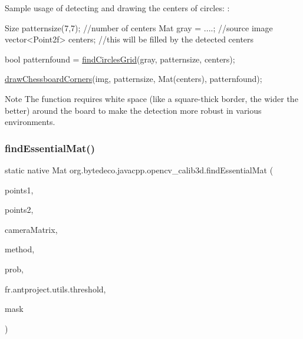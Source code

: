 Sample usage of detecting and drawing the centers of circles\+: \+: 
\begin{DoxyPre}
\begin{DoxyCode}
Size patternsize(7,7); \textcolor{comment}{//number of centers}
Mat gray = ....; \textcolor{comment}{//source image}
vector<Point2f> centers; \textcolor{comment}{//this will be filled by the detected centers}

\textcolor{keywordtype}{bool} patternfound = \hyperlink{group__calib3d_ga150470ce16ca1879fd1809729801803b}{findCirclesGrid}(gray, patternsize, centers);

\hyperlink{group__calib3d_ga71d497eb4a9eead84d1e4522d54ed580}{drawChessboardCorners}(img, patternsize, Mat(centers), patternfound);
\end{DoxyCode}
 \end{DoxyPre}
 \begin{DoxyNote}{Note}
The function requires white space (like a square-\/thick border, the wider the better) around the board to make the detection more robust in various environments. 
\end{DoxyNote}
\mbox{\label{group__calib3d_gad86954f592d1f99b0f8cdec7f4134c7a}} 
\subsubsection{\texorpdfstring{find\+Essential\+Mat()}{findEssentialMat()}\hspace{0.1cm}{\footnotesize\ttfamily [1/2]}}
{\footnotesize\ttfamily static native Mat org.\+bytedeco.\+javacpp.\+opencv\+\_\+calib3d.\+find\+Essential\+Mat (\begin{DoxyParamCaption}\item[{@By\+Val Mat}]{points1,  }\item[{@By\+Val Mat}]{points2,  }\item[{@By\+Val Mat}]{camera\+Matrix,  }\item[{int}]{method,  }\item[{double}]{prob,  }\item[{double}]{fr.antproject.utils.threshold,  }\item[{@By\+Val(null\+Value=\char`\"{}cv\+::\+Output\+Array(cv\+::no\+Array())\char`\"{}) Mat}]{mask }\end{DoxyParamCaption})\hspace{0.3cm}{\ttfamily [static]}}



